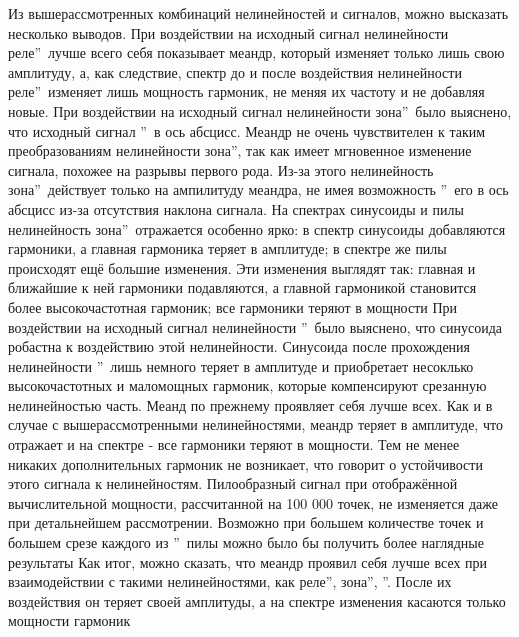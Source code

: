 Из вышерассмотренных комбинаций нелинейностей и сигналов, можно
высказать несколько выводов.
При воздействии на исходный сигнал нелинейности
 реле\textquotedblright\ лучше всего
себя показывает меандр, который изменяет только лишь свою амплитуду,
а, как следствие, спектр до и после воздействия нелинейности
 реле\textquotedblright\ изменяет лишь
мощность гармоник, не меняя их частоту и не добавляя новые.
При воздействии на исходный сигнал нелинейности
 зона\textquotedblright\ было выяснено,
что исходный сигнал \textquotedblright\ в ось
абсцисс. Меандр не очень чувствителен к таким преобразованиям 
нелинейности  зона\textquotedblright, так как
имеет мгновенное изменение сигнала, похожее на разрывы первого
рода. Из-за этого нелинейность  зона\textquotedblright\
действует только на ампилитуду меандра, не имея возможность
\textquotedblright\ его в ось
абсцисс из-за отсутствия наклона сигнала. На спектрах синусоиды и
пилы нелинейность \textquotedblleftМёртвая зона\textquotedblright\ отражается
особенно ярко: в спектр синусоиды добавляются гармоники, а главная гармоника
теряет в амплитуде; в спектре же пилы происходят ещё большие изменения.
Эти изменения выглядят так: главная и ближайшие к ней гармоники
подавляются, а главной гармоникой становится более высокочастотная
гармоник; все гармоники теряют в мощности
При воздействии на исходный сигнал нелинейности
\textquotedblright\ было выяснено, что
синусоида робастна к воздействию этой нелинейности. Синусоида
после прохождения нелинейности \textquotedblright\
лишь немного теряет в амплитуде и приобретает несоклько высокочастотных
и маломощных гармоник, которые компенсируют срезанную нелинейностью
часть. Меанд по прежнему проявляет себя лучше всех. Как и в случае
с вышерассмотренными нелинейностями, меандр теряет в амплитуде, что
отражает и на спектре - все гармоники теряют в мощности. Тем не
менее никаких дополнительных гармоник не возникает, что говорит
о устойчивости этого сигнала к нелинейностям. Пилообразный сигнал
при отображённой вычислительной мощности, рассчитанной на 
100 000 точек, не изменяется даже при детальнейшем рассмотрении.
Возможно при большем количестве точек и большем срезе
каждого из \textquotedblleftзубчиков\textquotedblright\ пилы
можно было бы получить более наглядные результаты
Как итог, можно сказать, что меандр проявил себя лучше всех при
взаимодействии с такими нелинейностями, как
\textquotedblleftИдеальное реле\textquotedblright,
\textquotedblleftМёртвая зона\textquotedblright,
\textquotedblleftНасыщение\textquotedblright. После их
воздействия он теряет своей амплитуды, а на спектре изменения
касаются только мощности гармоник

